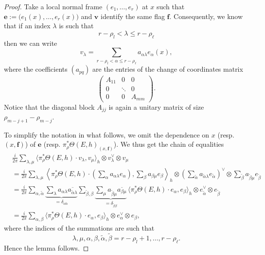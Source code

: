 \documentclass[10pt,a4paper]{amsart}
\begin{document}
\begin{proof}
	Take a local normal frame $ (e_1,\dots,e_r) $ at $ x $ such that $ \mathbf{e} := \bigl(e_1(x),\dots,e_r(x)\bigr) $ and $ \mathbf{v} $ identify the same flag $ \mathbf{f} $.
	Consequently, we know that if an index $ \lambda $ is such that
	\[
	r-\rho_l < \lambda \le r-\rho_{\ell}
	\]
	then we can write
	\begin{equation*}
		v_\lambda = \sum_{r-\rho_l < \alpha \le r-\rho_{\ell}} a_{\alpha \lambda} e_{\alpha}(x),
	\end{equation*}
	where the coefficients $ (a_{pq}) $ are the entries of the change of coordinates matrix
	\begin{equation*}
		\begin{pmatrix}
			A_{11} & 0 & 0 \\
			0 & \ddots & 0 \\
			0 & 0 & A_{mm}
		\end{pmatrix}.
	\end{equation*}
	Notice that the diagonal block $ A_{jj} $ is again a unitary matrix of size $ \rho_{m-j+1} - \rho_{m-j} $.
	
	To simplify the notation in what follows, we omit the dependence on $ x $ (resp. $ (x,\mathbf{f}) $) of $\mathbf{e}$ (resp. $  \pi_{\rho}^*\Theta(E,h)_{(x,\mathbf{f})} $).
	We thus get the chain of equalities
	\begin{align*}
		& \frac{i}{2\pi} \sum_{\lambda,\mu} \bigl\langle \pi_{\rho}^*\Theta(E,h)\cdot {v_\lambda}, {v_\mu} \bigr\rangle_h \otimes v_{\lambda}^{\vee} \otimes v_{\mu} \\
		&= \frac{i}{2\pi} \sum_{\lambda,\mu} {\left\langle {\pi_{\rho}^*\Theta(E,h)}\cdot \left( \sum_{\alpha} a_{\alpha \lambda} e_\alpha \right), \sum_{\beta} a_{\beta \mu} e_\beta \right\rangle_h} \otimes \left( \sum_{\tilde{\alpha}} a_{\tilde{\alpha} \lambda} e_{\tilde{\alpha}} \right)^{\vee} \otimes \sum_{\tilde{\beta}} a_{\tilde{\beta} \mu} e_{\tilde{\beta}} \\
		&= \frac{i}{2\pi} \sum_{\alpha,\tilde{\alpha}}\underbrace{ \sum_{\lambda} a_{\alpha \lambda} \overline{a_{\tilde{\alpha} \lambda}}}_{=\delta_{\alpha\tilde{\alpha}}} \sum_{\tilde{\beta},\beta}\underbrace{ \sum_{\mu} a_{\tilde{\beta} \mu} \overline{a_{\beta \mu}}}_{=\delta_{\tilde{\beta}\beta}} \,\bigl\langle {\pi_{\rho}^*\Theta(E,h)}\cdot {e_\alpha}, {e_\beta} \bigr\rangle_h \otimes e_{\tilde{\alpha}}^{\vee} \otimes e_{\tilde{\beta}} \\
		&= \frac{i}{2\pi} \sum_{\alpha,\beta}\bigl\langle {\pi_{\rho}^*\Theta(E,h)}\cdot {e_\alpha}, {e_\beta} \bigr\rangle_h \otimes e_{\alpha}^{\vee} \otimes e_{\beta},
	\end{align*}
	where the indices of the summations are such that
	\[
	\lambda,\mu,\alpha,\beta,\tilde{\alpha},\tilde{\beta} = r-\rho_l + 1, \dots, r-\rho_{\ell} .
	\]
	Hence the lemma follows.
\end{proof}
\end{document}
